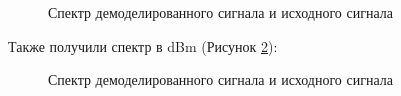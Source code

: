 \documentclass[a4paper,14pt]{extarticle}
\begin{document}
\begin{figure}[H]
\caption{Спектр демоделированного сигнала и исходного сигнала}
\label{10}
\end{figure}

Также получили спектр в dBm (Рисунок \ref{11}):

\begin{figure}[H]
\caption{Спектр демоделированного сигнала и исходного сигнала}
\label{11}
\end{figure}
\end{document}
